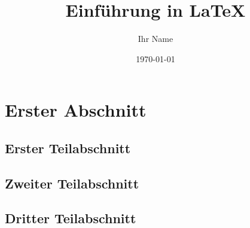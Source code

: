 \documentclass{article}
\author{Ihr Name}
\date{\today}
\title{Einführung in \LaTeX}
\begin{document}
\maketitle

\section{Erster Abschnitt}

\subsection{Erster Teilabschnitt}

\lipsum[1-2]

\subsection{Zweiter Teilabschnitt}

\lipsum[3-4]

\subsection{Dritter Teilabschnitt}

\lipsum[5-6]
\end{document}
